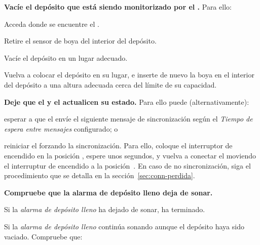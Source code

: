 \begin{enumeratecompact}

\item \textbf{Vacíe el depósito que está siendo monitorizado por el \MEE.} Para ello:

\begin{itemizecompact}

\item Acceda donde se encuentre el \MEE.

\item Retire el sensor de boya del interior del depósito.

\item Vacíe el depósito en un lugar adecuado.

\item Vuelva a colocar el depósito en su lugar, e inserte de nuevo la boya en el interior del depósito a una altura adecuada cerca del límite de su capacidad.  

\end{itemizecompact}

\item \textbf{Deje que el \MEE y el \MIE actualicen su estado.} Para ello puede (alternativamente):

\begin{enumeratecompact}
  
\item esperar a que el \MEE envíe el siguiente mensaje de sincronización según el \emph{Tiempo de espera entre mensajes} configurado; o

\item reiniciar el \MEE forzando la sincronización. Para ello, coloque el interruptor de encendido  en la posición \off, espere unos segundos, y vuelva a conectar el \ME moviendo el interruptur de encendido  a la posición~\on. En caso de no sincronización, siga el procedimiento que se detalla en la sección~\ref{sec:conn-perdida}.
  
\end{enumeratecompact}

\item \textbf{Compruebe que la alarma de depósito lleno deja de sonar.} 

\begin{itemizecompact}

\item Si la \emph{alarma de depósito lleno} ha dejado de sonar, ha terminado.

\item Si la \emph{alarma de depósito lleno} continúa sonando aunque el depósito haya sido vaciado. Compruebe que:


\end{itemizecompact}
\end{enumeratecompact}
